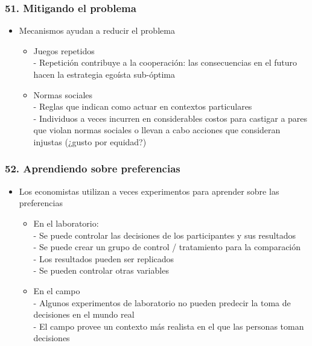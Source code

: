 \documentclass[14pt]{beamer}
\begin{document}
\begin{frame}
\frametitle{51. Mitigando el problema}
\begin{itemize}
    \item Mecanismos ayudan a reducir el problema
    \begin{itemize}
        \item Juegos repetidos \\
        - Repetición contribuye a la cooperación: las consecuencias en el futuro hacen la estrategia egoísta sub-óptima
        \item Normas sociales \\
        - Reglas que indican como actuar en contextos particulares \\
        - Individuos a veces incurren en considerables costos para castigar a pares que violan normas sociales o llevan a cabo acciones que consideran injustas (¿gusto por equidad?)
    \end{itemize}
\end{itemize}
\end{frame}

\begin{frame}
\frametitle{52. Aprendiendo sobre preferencias}
\begin{itemize}
    \item Los economistas utilizan a veces experimentos para aprender sobre las preferencias
    \begin{itemize}
        \item En el laboratorio: \\
        - Se puede controlar las decisiones de los participantes y sus resultados \\
        - Se puede crear un grupo de control / tratamiento para la comparación \\
        - Los resultados pueden ser replicados \\
        - Se pueden controlar otras variables
        \item En el campo \\
        - Algunos experimentos de laboratorio no pueden predecir la toma de decisiones en el mundo real \\
        - El campo provee un contexto más realista en el que las personas toman decisiones
    \end{itemize}
\end{itemize}
\end{frame}
\end{document}
